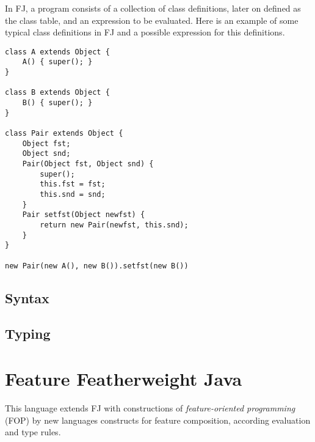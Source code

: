 In FJ, a program consists of a collection of class definitions, later on defined
as the class table, and an expression to be evaluated. Here is an example of some typical
class definitions in FJ and a possible expression for this definitions.

\begin{verbatim} 
class A extends Object {
    A() { super(); } 
} 

class B extends Object { 
    B() { super(); }
} 

class Pair extends Object { 
    Object fst; 
    Object snd;
    Pair(Object fst, Object snd) { 
        super(); 
        this.fst = fst; 
        this.snd = snd; 
    } 
    Pair setfst(Object newfst) { 
        return new Pair(newfst, this.snd); 
    } 
} 

new Pair(new A(), new B()).setfst(new B())
\end{verbatim}

\subsection{Syntax}



\subsection{Typing}

\section{Feature Featherweight Java}

This language extends FJ with constructions of \textit{feature-oriented
programming} (FOP) by new languages constructs for feature composition,
according evaluation and type rules.



